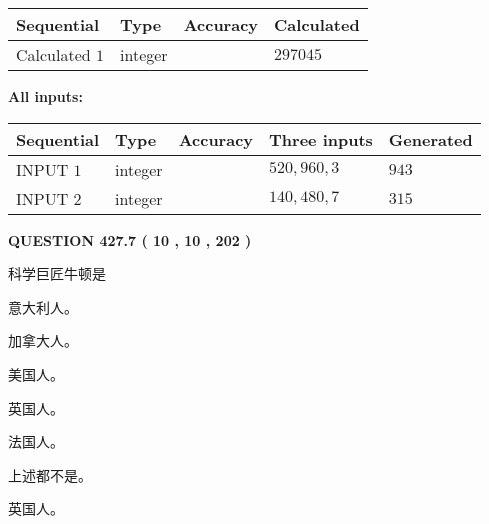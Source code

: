 \documentclass{ctexart}
\begin{document}
   
   
   
\noindent{}
   
   
  
  
\noindent\begin{tabular}{|l|l|l|l|}
\hline
 Sequential & Type & Accuracy & Calculated \\ 
\hline
 
 
  Calculated $  1 $ & integer &  & 
  $ 297045 $ 
 \\  \hline  
 \end{tabular}
   
   
   
   
\noindent\vspace{0.1in}\hspace{-0.08in} {\textbf{\Large{All inputs: }}}
   
   
  
  
\noindent\begin{tabular}{|l|l|l|l|l|}
\hline
 Sequential & Type & Accuracy & Three inputs & Generated \\ 
\hline
 
 
  INPUT $  1 $ & integer &  & $
 520
 , 
 960
 , 
 3
 $ & $ 943 $ 
 \\  \hline  
 
 
  INPUT $  2 $ & integer &  & $
 140
 , 
 480
 , 
 7
 $ & $ 315 $ 
 \\  \hline  
 \end{tabular}
   
   
  
\vspace{0.2in}
  
{\textbf{\Large{QUESTION
427.7 
 ( 10 , 10 , 202 )
}}}
  
  
科学巨匠牛顿是
 
 
意大利人。
 
 
加拿大人。
 
 
美国人。
 
 
英国人。
 
 
法国人。
 
 
 上述都不是。
 
 
\noindent{}
 
 
英国人。
 
\end{document}
